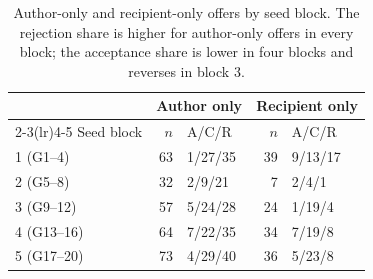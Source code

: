 \begin{table}[htbp]
\centering\small
\begin{tabular}{@{}lrlrl@{}}
\toprule
& \multicolumn{2}{c}{Author only} & \multicolumn{2}{c}{Recipient only}\\
\cmidrule(lr){2-3}\cmidrule(lr){4-5}
Seed block & $n$ & A/C/R & $n$ & A/C/R\\
\midrule
1 (G1--4) & 63 & 1/27/35 & 39 & 9/13/17\\
2 (G5--8) & 32 & 2/9/21 & 7 & 2/4/1\\
3 (G9--12) & 57 & 5/24/28 & 24 & 1/19/4\\
4 (G13--16) & 64 & 7/22/35 & 34 & 7/19/8\\
5 (G17--20) & 73 & 4/29/40 & 36 & 5/23/8\\
\bottomrule
\end{tabular}
\caption{Author-only and recipient-only offers by seed block. The rejection share is higher for author-only offers in every block; the acceptance share is lower in four blocks and reverses in block 3.}
\label{tab:app-blocks}
\end{table}
